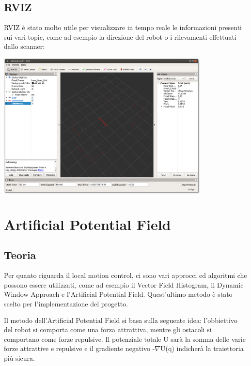 \documentclass[Lau, binding=0.6cm, oneside]{sapthesis}
\begin{document}
\subsection{RVIZ}
RVIZ è stato molto utile per visualizzare in tempo reale le informazioni presenti sui vari topic, come ad esempio la direzione del robot o i rilevamenti effettuati dallo scanner:

\vspace{1em}
\includegraphics[height=20em]{rviz.png}

\section{Artificial Potential Field}
\subsection{Teoria}
Per quanto riguarda il local motion control, ci sono vari approcci ed algoritmi che possono essere utilizzati, come ad esempio il Vector Field Histogram, il Dynamic Window Approach e l'Artificial Potential Field.
Quest'ultimo metodo è stato scelto per l'implementazione del progetto.

Il metodo dell'Artificial Potential Field si basa sulla seguente idea: l'obbiettivo del robot si comporta come una forza attrattiva, mentre gli ostacoli si comportano come forze repulsive.
Il potenziale totale U sarà la somma delle varie forze attrattive e repulsive e il gradiente negativo -$\nabla$U(q) indicherà la traiettoria più sicura.
\end{document}

